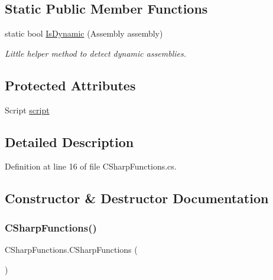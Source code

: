\subsection*{Static Public Member Functions}
\begin{DoxyCompactItemize}
\item 
static bool \hyperlink{class_c_sharp_functions_a440e1fe10d78acf073131c5bd955ff53}{Is\+Dynamic} (Assembly assembly)
\begin{DoxyCompactList}\small\item\em Little helper method to detect dynamic assemblies. \end{DoxyCompactList}\end{DoxyCompactItemize}
\subsection*{Protected Attributes}
\begin{DoxyCompactItemize}
\item 
Script \hyperlink{class_c_sharp_functions_a92ab2b9c669d0471db1ecb4f2d7a4e68}{script}
\end{DoxyCompactItemize}


\subsection{Detailed Description}


Definition at line 16 of file C\+Sharp\+Functions.\+cs.



\subsection{Constructor \& Destructor Documentation}
\mbox{\label{class_c_sharp_functions_aad8975e1b2fb708a34d1fc048ff8baf9}} 
\subsubsection{\texorpdfstring{C\+Sharp\+Functions()}{CSharpFunctions()}}
{\footnotesize\ttfamily C\+Sharp\+Functions.\+C\+Sharp\+Functions (\begin{DoxyParamCaption}{ }\end{DoxyParamCaption})}



